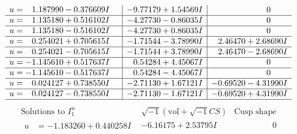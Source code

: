 \documentclass[1p]{elsarticle_modified}
\theoremstyle{definition}
\newcommand{\I}{\sqrt{-1}}
\begin{document}
$$\begin{array}{c|c|c}
\begin{aligned}
u &= \phantom{-}1.187990 - 0.376609 I\end{aligned}
 & -9.77179 + 1.54569 I & \phantom{-0.000000 } 0 \\ \hline\begin{aligned}
u &= \phantom{-}1.135180 + 0.516102 I\end{aligned}
 & -4.27730 - 0.86035 I & \phantom{-0.000000 } 0 \\ \hline\begin{aligned}
u &= \phantom{-}1.135180 - 0.516102 I\end{aligned}
 & -4.27730 + 0.86035 I & \phantom{-0.000000 } 0 \\ \hline\begin{aligned}
u &= \phantom{-}0.254021 + 0.705615 I\end{aligned}
 & -1.71544 - 3.78990 I & \phantom{-}2.46470 + 2.68690 I \\ \hline\begin{aligned}
u &= \phantom{-}0.254021 - 0.705615 I\end{aligned}
 & -1.71544 + 3.78990 I & \phantom{-}2.46470 - 2.68690 I \\ \hline\begin{aligned}
u &= -1.145610 + 0.517637 I\end{aligned}
 & \phantom{-}0.54284 + 4.45067 I & \phantom{-0.000000 } 0 \\ \hline\begin{aligned}
u &= -1.145610 - 0.517637 I\end{aligned}
 & \phantom{-}0.54284 - 4.45067 I & \phantom{-0.000000 } 0 \\ \hline\begin{aligned}
u &= \phantom{-}0.024127 + 0.738550 I\end{aligned}
 & -2.71130 + 1.67121 I & -0.69520 - 4.31990 I \\ \hline\begin{aligned}
u &= \phantom{-}0.024127 - 0.738550 I\end{aligned}
 & -2.71130 - 1.67121 I & -0.69520 + 4.31990 I\\
 \hline 
 \end{array}$$\newpage$$\begin{array}{c|c|c}  
\text{Solutions to }I^u_{1}& \I (\text{vol} + \sqrt{-1}CS) & \text{Cusp shape}\\
 \hline 
\begin{aligned}
u &= -1.183260 + 0.440258 I\end{aligned}
 & -6.16175 + 2.53795 I & \phantom{-0.000000 } 0 \\ \hline\begin{aligned}

\end{aligned}
\end{array}$$
\end{document}

